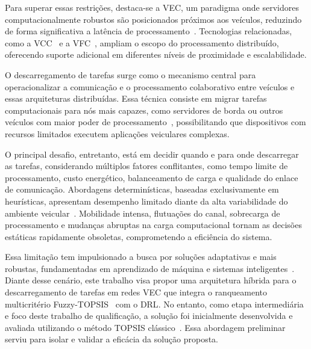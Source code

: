 Para superar essas restrições, destaca-se a \gls{VEC}, um paradigma onde servidores computacionalmente robustos são posicionados próximos aos veículos, reduzindo de forma significativa a latência de processamento~\cite{liu2021}. Tecnologias relacionadas, como a \gls{VCC}~\cite{whaiduzzaman2014} e a \gls{VFC}~\cite{keshari2022}, ampliam o escopo do processamento distribuído, oferecendo suporte adicional em diferentes níveis de proximidade e escalabilidade.

O descarregamento de tarefas surge como o mecanismo central para operacionalizar a comunicação e o processamento colaborativo entre veículos e essas arquiteturas distribuídas. Essa técnica consiste em migrar tarefas computacionais para nós mais capazes, como servidores de borda ou outros veículos com maior poder de processamento~\cite{wang2022}, possibilitando que dispositivos com recursos limitados executem aplicações veiculares complexas.

O principal desafio, entretanto, está em decidir quando e para onde descarregar as tarefas, considerando múltiplos fatores conflitantes, como tempo limite de processamento, custo energético, balanceamento de carga e qualidade do enlace de comunicação. Abordagens determinísticas, baseadas exclusivamente em heurísticas, apresentam desempenho limitado diante da alta variabilidade do ambiente veicular~\cite{ahmed2022}. Mobilidade intensa, flutuações do canal, sobrecarga de processamento e mudanças abruptas na carga computacional tornam as decisões estáticas rapidamente obsoletas, comprometendo a eficiência do sistema.

Essa limitação tem impulsionado a busca por soluções adaptativas e mais robustas, fundamentadas em aprendizado de máquina e sistemas inteligentes~\cite{mao2017,zhang2018,zhou2019,huang2020,shi2023,nieto2024}. Diante desse cenário, este trabalho visa propor uma arquitetura híbrida para o descarregamento de tarefas em redes \gls{VEC} que integra o ranqueamento multicritério Fuzzy-\gls{TOPSIS}~\cite{chen2000} com o \gls{DRL}. No entanto, como etapa intermediária e foco deste trabalho de qualificação, a solução foi inicialmente desenvolvida e avaliada utilizando o método \gls{TOPSIS} clássico~\cite{hwang1981}. Essa abordagem preliminar serviu para isolar e validar a eficácia da solução proposta.


